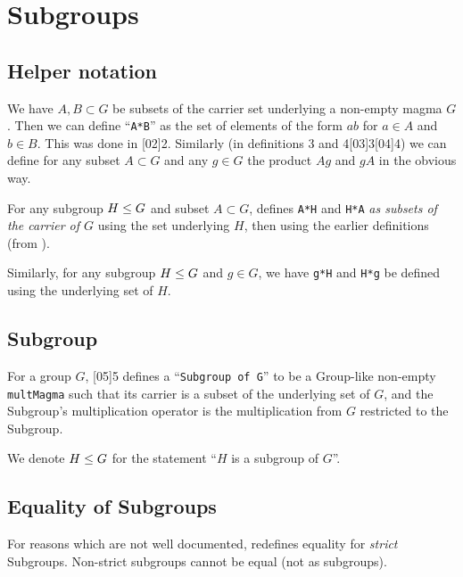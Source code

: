 \section{Subgroups}

\subsection{Helper notation}
We have $A,B\subset G$ be subsets of the carrier set underlying a
non-empty magma $G$. Then we can define ``\lstinline{A*B}'' as the set of
elements of the form $ab$ for $a\in A$ and $b\in B$. This was done in
[02]{2}. Similarly (in definitions
3 and 4[03]{3}[04]{4}) we can define
for any subset $A\subset G$ and any $g\in G$ the product $Ag$ and $gA$
in the obvious way.

For any subgroup $H\leq G$ and subset $A\subset G$,
 defines \lstinline{A*H} and
\lstinline{H*A} \emph{as subsets of the carrier of $G$} using the set
underlying $H$, then using the earlier definitions (from
).

Similarly, for any subgroup $H\leq G$ and $g\in G$, we have
\lstinline{g*H} and \lstinline{H*g} be defined using the underlying set of $H$.

\subsection{Subgroup}
For a group $G$, [05]{5} defines a
``\lstinline{Subgroup of G}'' to be a Group-like non-empty \lstinline{multMagma}
such that its carrier is a subset of the underlying set of $G$, and the
Subgroup's multiplication operator is the multiplication from $G$
restricted to the Subgroup.

\begin{notation}
We denote $H\leq G$ for the statement ``$H$ is a subgroup of $G$''.
\end{notation}

\subsection{Equality of Subgroups}\label{par:introduction:subgroup-equality}
For reasons which are not well documented, 
redefines equality for \emph{strict} Subgroups. Non-strict subgroups
cannot be equal (not as subgroups).

